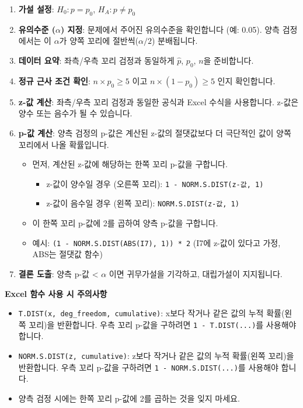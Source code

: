 \documentclass[11pt,a4paper]{book}
\theoremstyle{definition}
\begin{document}
\begin{enumerate}
    \item \textbf{가설 설정}: $H_0: p = p_0$, $H_A: p \ne p_0$
    \item \textbf{유의수준 ($\alpha$) 지정}: 문제에서 주어진 유의수준을 확인합니다 (예: 0.05). 양측 검정에서는 이 $\alpha$가 양쪽 꼬리에 절반씩($\alpha/2$) 분배됩니다.
    \item \textbf{데이터 요약}: 좌측/우측 꼬리 검정과 동일하게 $\hat{p}$, $p_0$, $n$을 준비합니다.
    \item \textbf{정규 근사 조건 확인}: $n \times p_0 \ge 5$ 이고 $n \times (1 - p_0) \ge 5$ 인지 확인합니다.
    \item \textbf{z-값 계산}: 좌측/우측 꼬리 검정과 동일한 공식과 Excel 수식을 사용합니다. z-값은 양수 또는 음수가 될 수 있습니다.
    \item \textbf{p-값 계산}: 양측 검정의 p-값은 계산된 z-값의 절댓값보다 더 극단적인 값이 양쪽 꼬리에서 나올 확률입니다.
    \begin{itemize}
        \item 먼저, 계산된 z-값에 해당하는 한쪽 꼬리 p-값을 구합니다.
        \begin{itemize}
            \item z-값이 양수일 경우 (오른쪽 꼬리): \texttt{1 - NORM.S.DIST(z-값, 1)}
            \item z-값이 음수일 경우 (왼쪽 꼬리): \texttt{NORM.S.DIST(z-값, 1)}
        \end{itemize}
        \item 이 한쪽 꼬리 p-값에 2를 곱하여 양측 p-값을 구합니다.
        \item 예시: \texttt{(1 - NORM.S.DIST(ABS(I7), 1)) * 2} (I7에 z-값이 있다고 가정, ABS는 절댓값 함수)
    \end{itemize}
    \item \textbf{결론 도출}: 양측 p-값 < $\alpha$ 이면 귀무가설을 기각하고, 대립가설이 지지됩니다.
\end{enumerate}

\begin{warningbox}
\textbf{Excel 함수 사용 시 주의사항}
\begin{itemize}
    \item \texttt{T.DIST(x, deg\_freedom, cumulative)}: x보다 작거나 같은 값의 누적 확률(왼쪽 꼬리)을 반환합니다. 우측 꼬리 p-값을 구하려면 \texttt{1 - T.DIST(...)}를 사용해야 합니다.
    \item \texttt{NORM.S.DIST(z, cumulative)}: z보다 작거나 같은 값의 누적 확률(왼쪽 꼬리)을 반환합니다. 우측 꼬리 p-값을 구하려면 \texttt{1 - NORM.S.DIST(...)}를 사용해야 합니다.
    \item 양측 검정 시에는 한쪽 꼬리 p-값에 2를 곱하는 것을 잊지 마세요.
\end{itemize}
\end{warningbox}
\end{document}
